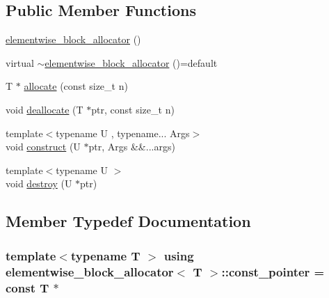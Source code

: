 \subsection*{Public Member Functions}
\begin{DoxyCompactItemize}
\item 
\hyperlink{classelementwise__block__allocator_a8175b2d3ec243bd30a24aab1da8d6433}{elementwise\+\_\+block\+\_\+allocator} ()
\item 
virtual \hyperlink{classelementwise__block__allocator_a00e784cf4d72a47d3afc7a61dc6db98e}{$\sim$elementwise\+\_\+block\+\_\+allocator} ()=default
\item 
T $\ast$ \hyperlink{classelementwise__block__allocator_a244160f3cdc30a5cbe992b001da86cae}{allocate} (const size\+\_\+t n)
\item 
void \hyperlink{classelementwise__block__allocator_add41be398fcb515fec16622ff41e5f0f}{deallocate} (T $\ast$ptr, const size\+\_\+t n)
\item 
{\footnotesize template$<$typename U , typename... Args$>$ }\\void \hyperlink{classelementwise__block__allocator_a4826c3a40b3d5d9be3ab42191817f216}{construct} (U $\ast$ptr, Args \&\&...args)
\item 
{\footnotesize template$<$typename U $>$ }\\void \hyperlink{classelementwise__block__allocator_ae4e94b11ffdc895aa80d9b5d9b7b0999}{destroy} (U $\ast$ptr)
\end{DoxyCompactItemize}


\subsection{Member Typedef Documentation}
\subsubsection[{\texorpdfstring{const\+\_\+pointer}{const_pointer}}]{\setlength{\rightskip}{0pt plus 5cm}template$<$typename T $>$ using {\bf elementwise\+\_\+block\+\_\+allocator}$<$ T $>$\+::{\bf const\+\_\+pointer} =  const T $\ast$}\hypertarget{classelementwise__block__allocator_a9382f12bfa2ba50e989f2f84216f44f1}{}\label{classelementwise__block__allocator_a9382f12bfa2ba50e989f2f84216f44f1}
